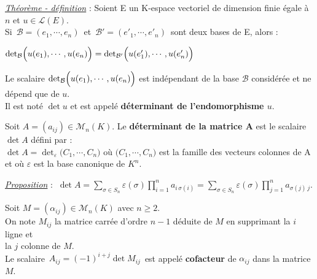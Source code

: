 \newpage

\underline{\emph{Théorème - définition}} : Soient E un K-espace vectoriel de dimension finie égale à $n$ et \(u\in \mathscr{L}(E)\).\vspace{0.05cm} \\
Si \(\,\mathcal{B}=(e_1,\cdots,e_n)\,\) et \(\,\mathcal{B}'=(e'_1,\cdots,e'_n)\,\) sont deux bases de E, alors : \vspace{-0.2cm}
\begin{center}
    \(\det_\mathcal{B}\Bigl(u(e_1),\cdots,u(e_n)\Bigr)=\det_{\mathcal{B}'}\Bigl(u(e'_1),\cdots,u(e'_n)\Bigr) \)
\end{center}\vspace{-0.2cm}
Le scalaire \(\det_\mathcal{B}\Bigl(u(e_1),\cdots,u(e_n)\Bigr)\) est indépendant de la base \(\mathcal{B}\) considérée et ne dépend que de \(u\).\\
Il est noté \(\det u\) et est appelé \textbf{déterminant de l'endomorphisme \(u\)}. 

\vspace{1.6cm}

Soit \(A=(a_{ij})\in \mathcal{M}_n(K).\) Le \textbf{déterminant de la matrice A} est le scalaire \(\det A\) défini par :\\
\(\det A = \det_\varepsilon\bigl(C_1,\cdots,C_n\bigr) \) où \(\bigl(C_1,\cdots,C_n\bigr)\) est la famille des vecteurs colonnes de A et où \(\varepsilon\) est la base canonique de \(K^n\).

\emph{\underline{Proposition}} : \(\displaystyle\ \det A = \sum_{\sigma \in S_n}\varepsilon(\sigma)\prod_{i=1}^{n}a_{i\,\sigma(i)}=\sum_{\sigma \in S_n}\varepsilon(\sigma)\prod_{j=1}^{n}a_{\sigma(j)\,j}.\)

\vspace{1.5cm}

Soit \(M=(\alpha_{ij})\in\mathcal{M}_n(K)\) avec \(n\geq 2\).\\
On note \(M_{ij} \) la matrice carrée d'ordre \(n-1\) déduite de \(M\) en supprimant la $i$ ligne et\\
la $j$ colonne de $M$.\\
Le scalaire \(\,A_{ij}=(-1)^{i+j}\det M_{ij}\, \) est appelé \textbf{cofacteur} de \(\alpha_{ij} \) dans la matrice \(M\).\vspace{0.5cm}


